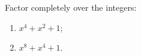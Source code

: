 Factor completely over the integers:
\begin{enumerate}
\item[(a)] $x^4+x^2+1$;
\item[(b)] $x^8+x^4+1$.
\end{enumerate}
